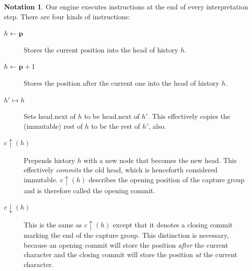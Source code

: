 \documentclass[11pt]{Thesis}
\theoremstyle{definition}
\newtheorem*{notation}{Notation}
\newcommand{\pos}{\mathbf{\mathbf{p}}}
\begin{document}
\begin{notation}
Our engine executes instructions at the end of every interpretation
step. There are four kinds of instructions:

\begin{description}
\item [$h\leftarrow\pos$] Stores the current position into the head of history $h$.
\item [$h\leftarrow\pos+1$] Stores the position after the current one into the
  head of history $h$.
\item [$h'\mapsto h$] Sets head.next of $h$ to be head.next of $h'$. 
	This effectively copies the (immutable) rest of $h$ to be the rest of $h'$, also. 
\item [$c\uparrow(h)$] Prepends history $h$ with a new node that becomes the
  new head.  This effectively \emph{commits} the old head, which is henceforth
  considered immutable. $c\uparrow(h)$ describes the opening position of the
  capture group and is therefore called the opening commit. 
\item [$c\downarrow(h)$] This is the same as $c\uparrow(h)$ except that it
  denotes a closing commit marking the end of the capture group.  This
  distinction is necessary, because an opening commit will store the position
  \emph{after} the current character and the closing commit will store the
  position \emph{at} the current character.
\end{description}
\end{notation}
\end{document}

